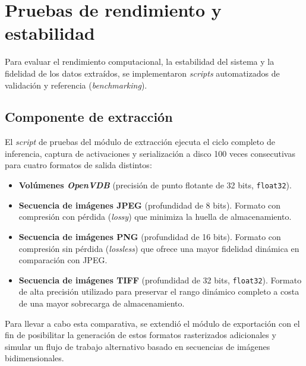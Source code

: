 \section{Pruebas de rendimiento y estabilidad}
Para evaluar el rendimiento computacional, la estabilidad del sistema y la fidelidad de los datos extraídos, se 
implementaron \textit{scripts} automatizados de validación y referencia (\textit{benchmarking}).

\subsection{Componente de extracción}
El \textit{script} de pruebas del módulo de extracción ejecuta el ciclo completo de inferencia, captura de 
activaciones y serialización a disco 100 veces consecutivas para cuatro formatos de salida distintos:
\begin{itemize}
    \item \textbf{Volúmenes \textit{OpenVDB}} (precisión de punto flotante de 32 bits, \texttt{float32}).
    \item \textbf{Secuencia de imágenes JPEG} (profundidad de 8 bits). Formato con compresión con pérdida 
    (\textit{lossy}) que minimiza la huella de almacenamiento.
    \item \textbf{Secuencia de imágenes PNG} (profundidad de 16 bits). Formato con compresión sin pérdida 
    (\textit{lossless}) que ofrece una mayor fidelidad dinámica en comparación con JPEG.
    \item \textbf{Secuencia de imágenes TIFF} (profundidad de 32 bits, \texttt{float32}). Formato de alta 
    precisión utilizado para preservar el rango dinámico completo a costa de una mayor sobrecarga de almacenamiento.
\end{itemize}

Para llevar a cabo esta comparativa, se extendió el módulo de exportación con el fin de posibilitar la generación 
de estos formatos rasterizados adicionales y simular un flujo de trabajo alternativo basado en secuencias de 
imágenes bidimensionales.
\medskip

